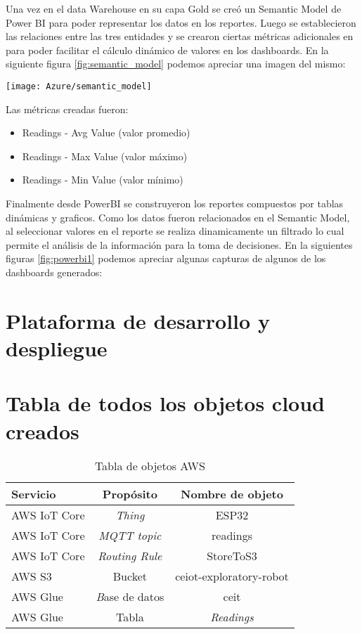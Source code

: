 Una vez en el data Warehouse en su capa Gold se creó un Semantic Model de Power BI para poder representar los datos en los reportes. Luego se establecieron las relaciones entre las tres entidades y se crearon ciertas métricas adicionales en para poder facilitar el cálculo dinámico de valores en los dashboards. En la siguiente figura \ref{fig:semantic_model} podemos apreciar una imagen del mismo:

\begin{center}
   \texttt{[image: Azure/semantic\_model]}
   \label{fig:semantic_model}
\end{center}

Las métricas creadas fueron:

\begin{itemize}
	\item Readings - Avg Value (valor promedio)
	\item Readings - Max Value (valor máximo)
	\item Readings - Min Value (valor mínimo)
\end{itemize}

Finalmente desde PowerBI se construyeron los reportes compuestos por tablas dinámicas y graficos. Como los datos fueron relacionados en el Semantic Model, al seleccionar valores en el reporte se realiza dinamicamente un filtrado lo cual permite el análisis de la información para la toma de decisiones. En la siguientes figuras \ref{fig:powerbi1} podemos apreciar algunas capturas de algunos de los dashboards generados:



\section{Plataforma de desarrollo y despliegue}



\section{Tabla de todos los objetos cloud creados}




\begin{table}[h]
	\centering
	\caption[caption corto]{Tabla de objetos AWS}
	\begin{tabular}{l c c}    
		\toprule
		\textbf{Servicio} & \textbf{Propósito} & \textbf{Nombre de objeto}  \\
		\midrule
		AWS IoT Core & \textit{Thing} & ESP32 \\		
		AWS IoT Core & \textit{MQTT topic} & readings \\		
		AWS IoT Core & \textit{Routing Rule} & StoreToS3 \\		
		AWS S3 & Bucket & ceiot-exploratory-robot \\	
		AWS Glue & \textit Base de datos & ceit \\		
		AWS Glue & Tabla & \textit{Readings} \\		

		\bottomrule
		\hline
	\end{tabular}
	\label{tab:peces}
\end{table}

